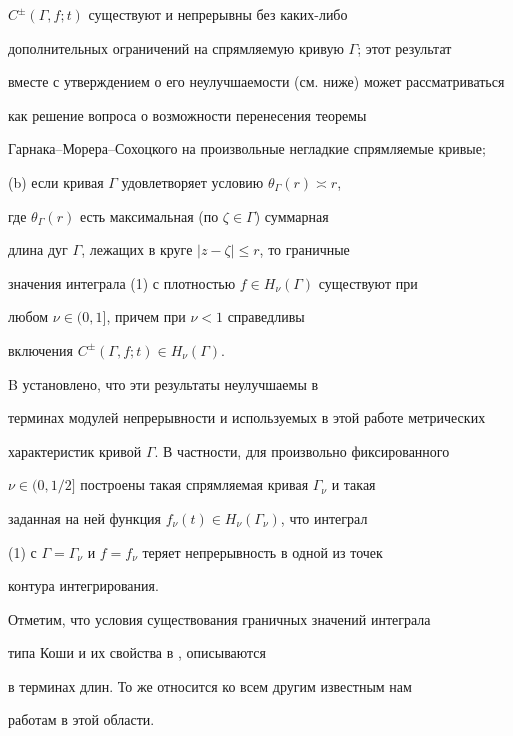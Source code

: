 $C^{\pm}(\Gamma, f;t)$ существуют и непрерывны без каких-либо


дополнительных ограничений на спрямляемую кривую $\Gamma$; этот результат


вместе с утверждением о его неулучшаемости (см. ниже) может рассматриваться


как решение вопроса о возможности перенесения теоремы


Гарнака--Морера--Сохоцкого на произвольные негладкие спрямляемые кривые;





(b) если кривая $\Gamma$ удовлетворяет условию $\theta_{\Gamma}(r)\asymp r$,


где $\theta_{\Gamma}(r)$ есть максимальная (по $\zeta\in\Gamma$) суммарная


длина дуг $\Gamma$, лежащих в круге $|z-\zeta|\le r$, то граничные


значения интеграла (1) с плотностью $f\in H_{\nu}(\Gamma)$ существуют при


любом $\nu\in (0,1]$, причем при $\nu<1$ справедливы


включения $C^{\pm}(\Gamma, f;t)\in H_{\nu}(\Gamma)$.





B \cite{Dy} установлено, что эти результаты неулучшаемы в


терминах модулей непрерывности и используемых в этой работе метрических


характеристик кривой $\Gamma$. В частности, для произвольно фиксированного


$\nu\in (0, 1/2]$ построены такая спрямляемая кривая $\Gamma_\nu$ и такая


заданная на ней функция $f_{\nu}(t)\in H_{\nu}(\Gamma_{\nu})$, что интеграл


(1) с $\Gamma = \Gamma_\nu$ и $f=f_\nu$ теряет непрерывность в одной из точек


контура интегрирования.





Отметим, что условия существования граничных значений интеграла


типа Коши и их свойства в \cite{Dy}, \cite{Sa} описываются


в терминах длин. То же относится ко всем другим известным нам


работам в этой области.





